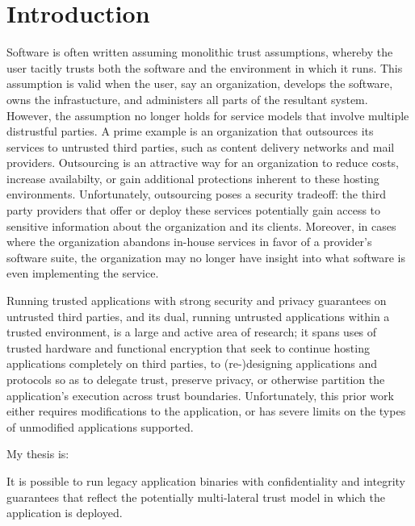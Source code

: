 \section{Introduction}
\label{sec:intro}

Software is often written assuming monolithic trust assumptions, whereby
the user tacitly trusts both the software and the environment in which it runs.
%
This assumption is valid when the user, say an organization, develops the
software, owns the infrastucture, and administers all parts of the resultant
system.
%
However, the assumption no longer holds for service models that involve
multiple distrustful parties.
%
A prime example is an organization that outsources its services to untrusted
third parties, such as content delivery networks and mail providers.
%
Outsourcing is an attractive way for an organization to reduce costs,
increase availabilty, or gain additional protections inherent to these hosting
environments.
%
Unfortunately, outsourcing poses a security tradeoff: the third party
providers that offer or deploy these services potentially gain access to
sensitive information about the organization and its clients.   
%
Moreover, in cases where the organization abandons in-house services in favor
of a provider's software suite, the organization may no longer have insight
into what software is even implementing the service.


%
Running trusted applications with strong security and privacy guarantees on untrusted
third parties, and its dual, running untrusted applications within a
trusted environment, is a large and active area of research; it spans uses of
trusted hardware and functional encryption that seek to continue hosting
applications completely on third parties, to (re-)designing applications and
protocols so as to delegate trust, preserve privacy, or otherwise partition
the application's execution across trust boundaries.
%
Unfortunately, this prior work either requires modifications to the
application, or has severe limits on the types of unmodified applications
supported.


My thesis is:
\begin{displayquote}
    It is possible to run legacy application binaries with confidentiality and
    integrity guarantees that reflect the potentially multi-lateral trust model
    in which the application is deployed.
\end{displayquote}

